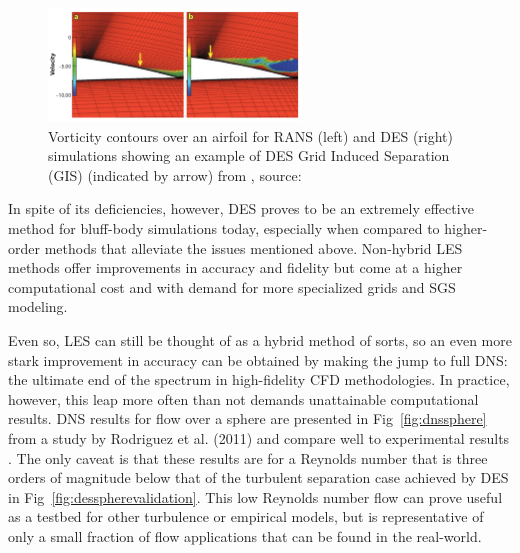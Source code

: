 \documentclass[journal]{new-aiaa}
\begin{document}
\begin{figure}[H]
\begin{center}
\includegraphics[width=0.6\textwidth]{Images/logan/spalart2009detachededdy_GridInducedSeparation.pdf}
\caption{ Vorticity contours over an airfoil for RANS (left) and DES (right) simulations showing an example of DES Grid Induced Separation (GIS) (indicated by arrow) from \cite{spalart2009detachededdy}, source: \cite{menter2004adaptation} }
\label{fig:desgridinducedseparation}
\end{center}
\end{figure}


In spite of its deficiencies, however, DES proves to be an extremely effective method for bluff-body simulations today, especially when compared to higher-order methods that alleviate the issues mentioned above. Non-hybrid LES methods offer improvements in accuracy and fidelity but come at a higher computational cost and with demand for more specialized grids and SGS modeling.

Even so, LES can still be thought of as a hybrid method of sorts, so an even more stark improvement in accuracy can be obtained by making the jump to full DNS: the ultimate end of the spectrum in high-fidelity CFD methodologies. In practice, however, this leap more often than not demands unattainable computational results. DNS results for flow over a sphere are presented in Fig~\ref{fig:dnssphere} from a study by Rodriguez et al. (2011) and compare well to experimental results \cite{rodriguez2011direct}. The only caveat is that these results are for a Reynolds number that is three orders of magnitude below that of the turbulent separation case achieved by DES in Fig~\ref{fig:desspherevalidation}. This low Reynolds number flow can prove useful as a testbed for other turbulence or empirical models, but is representative of only a small fraction of flow applications that can be found in the real-world.
\end{document}
